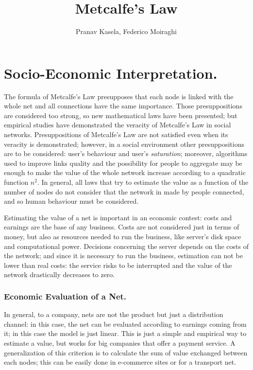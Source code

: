 \documentclass[12pt, a4page]{article}
\title{Metcalfe's Law}
\date{}
\author{Pranav Kasela, Federico Moiraghi}
\begin{document}
\maketitle

\part*{Socio-Economic Interpretation.}
The formula of Metcalfe's Law presupposes that each node is linked with the whole net and all connections have the same importance.
Those presuppositions are considered too strong, so new mathematical laws have been presented; but empirical studies have demonstrated the veracity of Metcalfe's Law in social networks. \newline
Presuppositions of Metcalfe's Law are not satisfied even when its veracity is demonstrated; however, in a social environment other presuppositions are to be considered: user's behaviour and user's \textit{saturation}; moreover, algorithms used to improve links quality and the possibility for people to aggregate may be enough to make the value of the whole network increase according to a quadratic function $n^2$. \newline
In general, all laws that try to estimate the value as a function of the number of nodes do not consider that the network in made by people connected, and so human behaviour must be considered. \newline

Estimating the value of a net is important in an economic contest: costs and earnings are the base of any business. Costs are not considered just in terms of money, but also as resources needed to run the business, like server's disk space and computational power.
Decisions concerning the server depends on the costs of the network; and since it is necessary to run the business, estimation can not be lower than real costs: the service risks to be interrupted and the value of the network drastically decreases to zero. \newline

\section{Economic Evaluation of a Net.}
In general, to a company, nets are not the product but just a distribution channel: in this case, the net can be evaluated according to earnings coming from it; in this case the model is just linear.
This is just a simple and empirical way to estimate a value, but works for big companies that offer a payment service. \newline
A generalization of this criterion is to calculate the sum of value exchanged between each nodes; this can be easily done in e-commerce sites or for a transport net. \newline%
\end{document}
